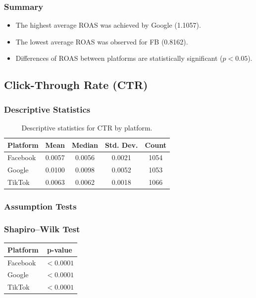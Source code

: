 \subsubsection{Summary}
\begin{itemize}
	\item The highest average ROAS was achieved by Google (1.1057).
	\item The lowest average ROAS was observed for FB (0.8162).
	\item Differences of ROAS between platforms are statistically significant ($p<0.05$).
\end{itemize}

\subsection{Click-Through Rate (CTR)} \label{appendix:platform_performance_analysis_CTR}

\subsubsection{Descriptive Statistics}

\begin{table}[H]
	\centering
	\caption{Descriptive statistics for CTR by platform.}
	\begin{tabular}{lcccc}
		\toprule
		Platform & Mean & Median & Std. Dev. & Count \\
		\midrule
		Facebook & 0.0057 & 0.0056 & 0.0021 & 1054 \\
		Google   & 0.0100 & 0.0098 & 0.0052 & 1053 \\
		TikTok   & 0.0063 & 0.0062 & 0.0018 & 1066 \\
		\bottomrule
	\end{tabular}
\end{table}

\subsubsection{Assumption Tests}

\subsubsection{Shapiro--Wilk Test}

\begin{table}[H]
	\centering
	\begin{tabular}{lc}
		\toprule
		Platform & p-value \\
		\midrule
		Facebook & $<0.0001$ \\
		Google & $<0.0001$ \\
		TikTok & $<0.0001$ \\
		\bottomrule
	\end{tabular}
\end{table}

